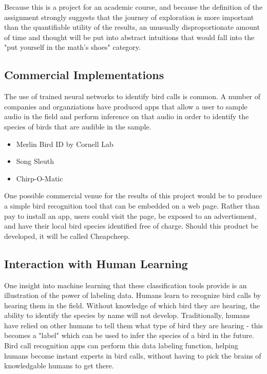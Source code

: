 \documentclass[sigconf]{acmart}
\begin{document}
Because this is a project for an academic course, and because the 
definition of the assignment strongly suggests that the journey of
exploration is more important than the quantifiable utility of the results,
an unusually disproportionate amount of time and thought will be put
into abstract intuitions that would fall into the "put yourself in the math's
shoes" category.


\subsection{Commercial Implementations}

The use of trained neural networks to identify bird calls is common. A
number of companies and organziations have produced apps that allow
a user to sample audio in the field and perform inference on that audio
in order to identify the species of birds that are audible in the sample.

\begin{itemize}
\item Merlin Bird ID by Cornell Lab  \cite{Merlin20}
\item Song Sleuth \cite{songsleuth20}
\item Chirp-O-Matic \cite{chirp20}
\end{itemize}

One possible commercial venue for the results of this project would be
to produce a simple bird recognition tool that can be embedded on a web
page. Rather than pay to install an app, users could visit the page, be
exposed to an advertisment, and have their local bird species identified 
free of charge. Should this product be developed, it will be called Cheapcheep.

\subsection{Interaction with Human Learning}

One insight into machine learning that these classification tools provide is an illustration of
the power of labeling data. Humans learn to recognize bird calls by hearing them
in the field. Without knowledge of which bird they are hearing, the ability to
identify the species by name will not develop. Traditionally, humans have relied on 
other humans to tell them what type of bird they are hearing - this becomes a "label"
which can be used to infer the species of a bird in the future. Bird call recognition
apps can perform this data labeling function, helping humans become instant 
experts in bird calls, without having to pick the brains of knowledgable humans to get there.
\end{document}
